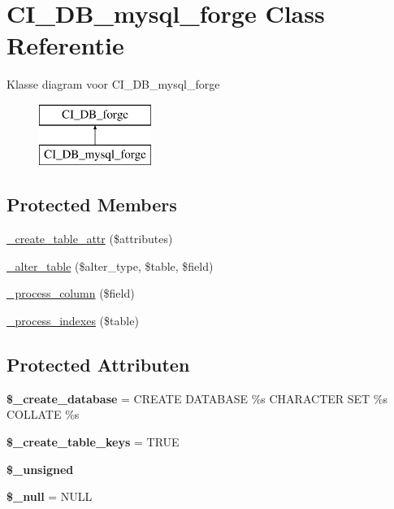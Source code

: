 \hypertarget{class_c_i___d_b__mysql__forge}{}\section{C\+I\+\_\+\+D\+B\+\_\+mysql\+\_\+forge Class Referentie}
\label{class_c_i___d_b__mysql__forge}
Klasse diagram voor C\+I\+\_\+\+D\+B\+\_\+mysql\+\_\+forge\begin{figure}[H]
\begin{center}
\leavevmode
\includegraphics[height=2.000000cm]{class_c_i___d_b__mysql__forge}
\end{center}
\end{figure}
\subsection*{Protected Members}
\begin{DoxyCompactItemize}
\item 
\mbox{\hyperlink{class_c_i___d_b__mysql__forge_a10b25326d82f6ddd9af1935e52e42b72}{\+\_\+create\+\_\+table\+\_\+attr}} (\$attributes)
\item 
\mbox{\hyperlink{class_c_i___d_b__mysql__forge_a41c6cae02f2fda8b429ad0afb9509426}{\+\_\+alter\+\_\+table}} (\$alter\+\_\+type, \$table, \$field)
\item 
\mbox{\hyperlink{class_c_i___d_b__mysql__forge_a8f38f1c5b5dddecca4befbe393f3f299}{\+\_\+process\+\_\+column}} (\$field)
\item 
\mbox{\hyperlink{class_c_i___d_b__mysql__forge_ae0bdb4ea3418590d1894c5b621b5ca50}{\+\_\+process\+\_\+indexes}} (\$table)
\end{DoxyCompactItemize}
\subsection*{Protected Attributen}
\begin{DoxyCompactItemize}
\item 
\mbox{\label{class_c_i___d_b__mysql__forge_acd23c9a8735806155f1a5d0a87c151f2}} 
{\bfseries \$\+\_\+create\+\_\+database} = \textquotesingle{}C\+R\+E\+A\+TE D\+A\+T\+A\+B\+A\+SE \%s C\+H\+A\+R\+A\+C\+T\+ER S\+ET \%s C\+O\+L\+L\+A\+TE \%s\textquotesingle{}
\item 
\mbox{\label{class_c_i___d_b__mysql__forge_a73e07acdd35c948ad353903c2827af6e}} 
{\bfseries \$\+\_\+create\+\_\+table\+\_\+keys} = T\+R\+UE
\item 
{\bfseries \$\+\_\+unsigned}
\item 
\mbox{\label{class_c_i___d_b__mysql__forge_ae58fe6a5104d4a069a49b27533ce808f}} 
{\bfseries \$\+\_\+null} = \textquotesingle{}N\+U\+LL\textquotesingle{}
\end{DoxyCompactItemize}
